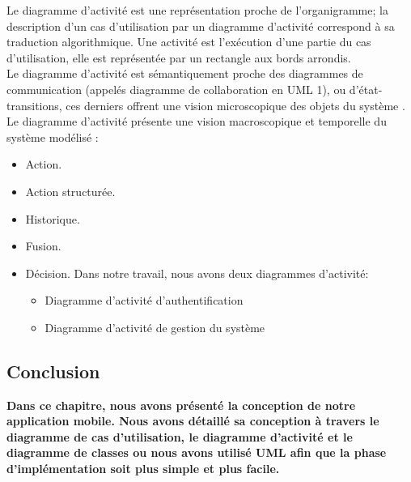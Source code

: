 \documentclass[french,a4,12pt]{report}
\begin{document}
Le diagramme d'activité est une représentation proche de l'organigramme; la description d'un cas d'utilisation par un diagramme d'activité correspond à sa traduction algorithmique. Une activité est l'exécution d'une partie du cas d'utilisation, elle est représentée par un rectangle aux bords arrondis.\\

Le diagramme d'activité est sémantiquement proche des diagrammes de communication (appelés diagramme de collaboration en UML 1), ou d'état-transitions, ces derniers offrent une vision microscopique des objets du système \cite{10}.\\
  
 Le diagramme d'activité présente une vision macroscopique et temporelle du système modélisé :
 \begin{itemize}%
\item Action.
\item Action structurée.
\item Historique.
\item Fusion.
\item Décision.
\newpage
Dans notre travail, nous avons deux diagrammes d'activité:
 \begin{itemize}%
	\item Diagramme d'activité d'authentification
\newpage

 \item Diagramme d'activité de gestion du système

  
\end{itemize} 
 \end{itemize} 

\newpage
\begin{tcolorbox}[leftrule=3mm]
\section{Conclusion}
\end{tcolorbox}
\textbf{Dans ce chapitre, nous avons  présenté la conception de notre application mobile. Nous avons détaillé sa conception  à travers  le  diagramme de cas d’utilisation, le diagramme d'activité et le diagramme de classes ou nous avons utilisé UML afin que la phase d'implémentation  soit plus simple et plus facile.} 
\end{document}
